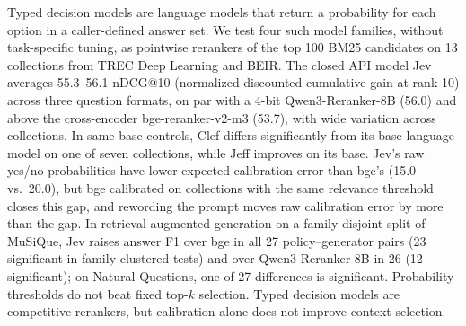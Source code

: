 Typed decision models are language models that return a probability for each option in a caller-defined answer set.
We test four such model families, without task-specific tuning, as pointwise rerankers of the top 100 BM25 candidates on 13 collections from TREC Deep Learning and BEIR.
The closed API model Jev averages 55.3--56.1 nDCG@10 (normalized discounted cumulative gain at rank 10) across three question formats, on par with a 4-bit Qwen3-Reranker-8B (56.0) and above the cross-encoder bge-reranker-v2-m3 (53.7), with wide variation across collections.
In same-base controls, Clef differs significantly from its base language model on one of seven collections, while Jeff improves on its base.
Jev's raw yes/no probabilities have lower expected calibration error than bge's (15.0 vs.\ 20.0), but bge calibrated on collections with the same relevance threshold closes this gap, and rewording the prompt moves raw calibration error by more than the gap.
In retrieval-augmented generation on a family-disjoint split of MuSiQue, Jev raises answer F1 over bge in all 27 policy--generator pairs (23 significant in family-clustered tests) and over Qwen3-Reranker-8B in 26 (12 significant); on Natural Questions, one of 27 differences is significant.
Probability thresholds do not beat fixed top-$k$ selection.
Typed decision models are competitive rerankers, but calibration alone does not improve context selection.
